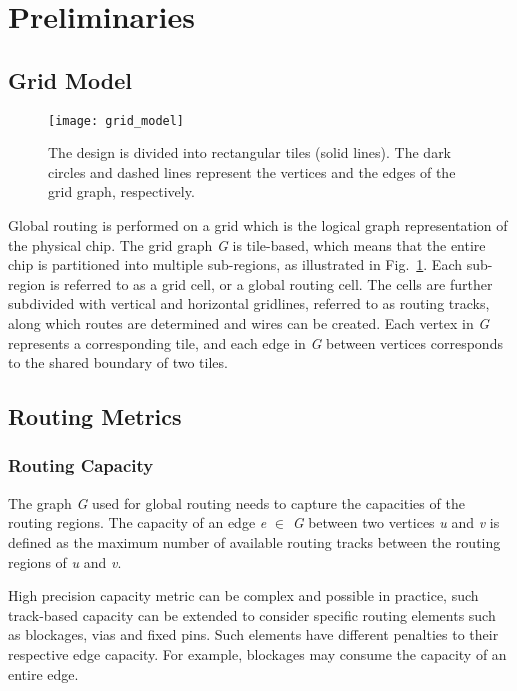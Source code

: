 \section{Preliminaries}
\label{sec:prelim}

\subsection{Grid Model}
\label{subsec:grid model}

\begin{figure}[tb!]
    \centering
    \texttt{[image: grid\_model]}
	\caption{The design is divided into rectangular tiles (solid lines). The dark
		circles and dashed lines represent the vertices and the edges of the grid graph, respectively.}
	\label{fig:grid_model}
\end{figure}

Global routing is performed on a grid which is the logical graph representation of the physical chip. The grid graph \emph{G} is tile-based, which means that the entire chip is partitioned into multiple sub-regions, as illustrated in Fig.~\ref{fig:grid_model}. Each sub-region is referred to as a grid cell, or a global routing cell. The cells are further subdivided with vertical and horizontal gridlines, referred to as routing tracks, along which routes are determined and wires can be created. Each vertex in \emph{G} represents a corresponding tile, and each edge in \emph{G} between vertices corresponds to the shared boundary of two tiles.

\subsection{Routing Metrics}
\subsubsection{Routing Capacity}
The graph \emph{G} used for global routing needs to capture the capacities of the routing regions. The capacity of an edge \emph{e} $\in$ \emph{G} between two vertices \emph{u} and \emph{v} is defined as the maximum number of available routing tracks between the routing regions of \emph{u} and \emph{v}. 

High precision capacity metric can be complex and possible in practice, such track-based capacity can be extended to consider specific routing elements such as blockages, vias and fixed pins. Such elements have different penalties to their respective edge capacity. For example, blockages may consume the capacity of an entire edge. 
